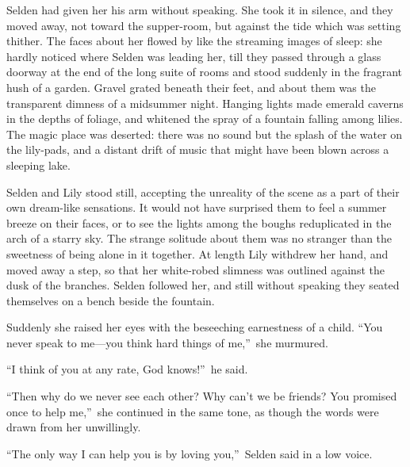 \documentclass[12pt,a4paper]{book}
\begin{document}
Selden had given her his arm without speaking. She took it in
silence, and they moved away, not toward the supper-room, but
against the tide which was setting thither. The faces about her
flowed by like the streaming images of sleep: she hardly noticed
where Selden was leading her, till they passed through a glass
doorway at the end of the long suite of rooms and stood suddenly
in the fragrant hush of a garden. Gravel grated beneath their
feet, and about them was the transparent dimness of a midsummer
night. Hanging lights made emerald caverns in the depths of
foliage, and whitened the spray of a fountain falling among
lilies. The magic place was deserted: there was no sound but the
splash of the water on the lily-pads, and a distant drift of
music that might have been blown across a sleeping lake.





Selden and Lily stood still, accepting the unreality of the scene
as a part of their own dream-like sensations. It would not have
surprised them to feel a summer breeze on their faces, or
to see the lights among the boughs reduplicated in the arch of a
starry sky. The strange solitude about them was no stranger than
the sweetness of being alone in it together. At length Lily
withdrew her hand, and moved away a step, so that her white-robed
slimness was outlined against the dusk of the branches. Selden
followed her, and still without speaking they seated themselves
on a bench beside the fountain.





Suddenly she raised her eyes with the beseeching earnestness of a
child. ``You never speak to me---you think hard things of me,''\ she
murmured.





``I think of you at any rate, God knows!''\ he said.





``Then why do we never see each other? Why can't we be friends? 
You promised once to help me,''\ she continued in the same tone, as
though the words were drawn from her unwillingly.





``The only way I can help you is by loving you,''\ Selden said in a
low voice.
\end{document}

